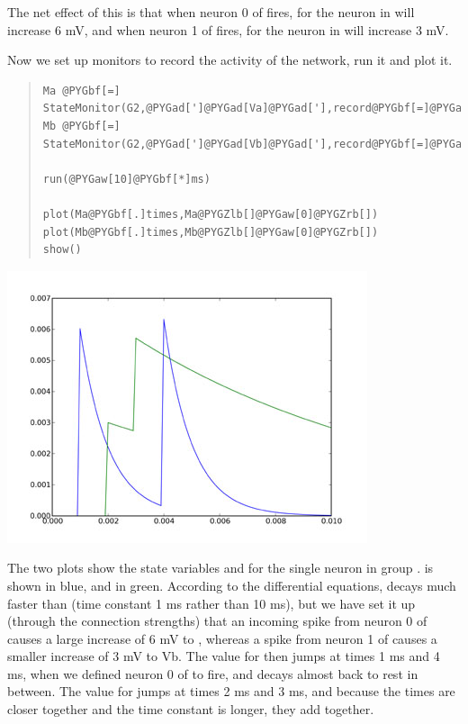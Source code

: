 \documentclass[letterpaper,10pt,english]{manual}
\begin{document}
The net effect of this is that when neuron 0 of  fires,  for
the neuron in  will increase 6 mV, and when neuron 1 of  fires,
 for the neuron in  will increase 3 mV.

Now we set up monitors to record the activity of the network,
run it and plot it.
\begin{quote}

\begin{Verbatim}[commandchars=@\[\]]
Ma @PYGbf[=] StateMonitor(G2,@PYGad[']@PYGad[Va]@PYGad['],record@PYGbf[=]@PYGaA[True])
Mb @PYGbf[=] StateMonitor(G2,@PYGad[']@PYGad[Vb]@PYGad['],record@PYGbf[=]@PYGaA[True])

run(@PYGaw[10]@PYGbf[*]ms)

plot(Ma@PYGbf[.]times,Ma@PYGZlb[]@PYGaw[0]@PYGZrb[])
plot(Mb@PYGbf[.]times,Mb@PYGZlb[]@PYGaw[0]@PYGZrb[])
show()
\end{Verbatim}
\end{quote}

\includegraphics{2a.jpg}

The two plots show the state variables  and  for the single
neuron in group .  is shown in blue, and  in green.
According to the differential equations,  decays much faster
than  (time constant 1 ms rather than 10 ms), but we have set
it up (through the connection strengths) that an incoming
spike from neuron 0 of  causes a large increase of 6 mV to ,
whereas a spike from neuron 1 of  causes a smaller increase of
3 mV to Vb. The value for  then jumps at times 1 ms and 4 ms,
when we defined neuron 0 of  to fire, and decays almost back
to rest in between. The value for  jumps at times 2 ms and
3 ms, and because the times are closer together and the time
constant is longer, they add together.
\end{document}

